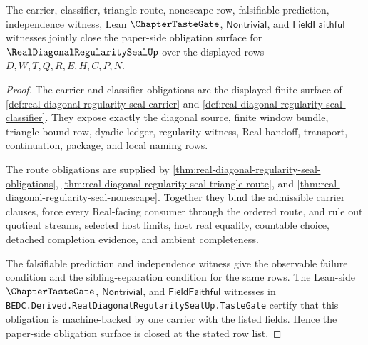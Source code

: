 

\begin{theorem}
\label{thm:real-diagonal-regularity-seal-tastegate-obligation-closure}
The carrier, classifier, triangle route, nonescape row, falsifiable prediction, independence witness, Lean $\ChapterTasteGate$, $\mathsf{Nontrivial}$, and $\mathsf{FieldFaithful}$ witnesses jointly close the paper-side obligation surface for $\RealDiagonalRegularitySealUp$ over the displayed rows $D,W,T,Q,R,E,H,C,P,N$.
\end{theorem}
\begin{proof}
The carrier and classifier obligations are the displayed finite surface of \autoref{def:real-diagonal-regularity-seal-carrier} and \autoref{def:real-diagonal-regularity-seal-classifier}. They expose exactly the diagonal source, finite window bundle, triangle-bound row, dyadic ledger, regularity witness, Real handoff, transport, continuation, package, and local naming rows.

The route obligations are supplied by \autoref{thm:real-diagonal-regularity-seal-obligations}, \autoref{thm:real-diagonal-regularity-seal-triangle-route}, and \autoref{thm:real-diagonal-regularity-seal-nonescape}. Together they bind the admissible carrier clauses, force every Real-facing consumer through the ordered route, and rule out quotient streams, selected host limits, host real equality, countable choice, detached completion evidence, and ambient completeness.

The falsifiable prediction and independence witness give the observable failure condition and the sibling-separation condition for the same rows. The Lean-side $\ChapterTasteGate$, $\mathsf{Nontrivial}$, and $\mathsf{FieldFaithful}$ witnesses in \texttt{BEDC.Derived.RealDiagonalRegularitySealUp.TasteGate} certify that this obligation is machine-backed by one carrier with the listed fields. Hence the paper-side obligation surface is closed at the stated row list.
\end{proof}

